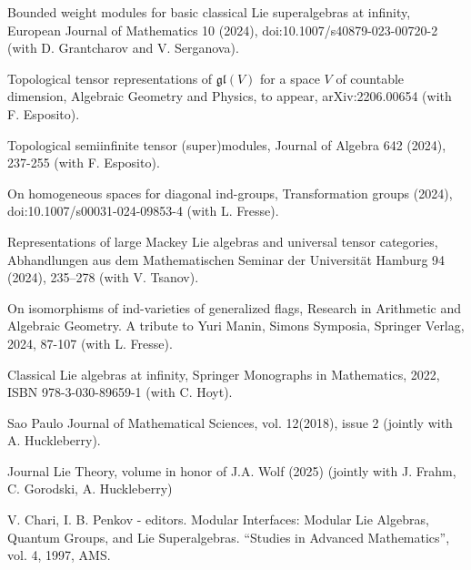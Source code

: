 \documentclass[11pt]{amsart}
\begin{document}
\myss \label{88.} Bounded weight modules for basic classical Lie superalgebras at infinity, European Journal of Mathematics 10 (2024), doi:10.1007/s40879-023-00720-2 (with D. Grantcharov and V. Serganova).

\myss \label{89.} Topological tensor representations of \(\mathfrak{gl}(V)\) for a space \(V\) of countable dimension, Algebraic Geometry and Physics, to appear, arXiv:2206.00654 (with F. Esposito).

\myss \label{90.} Topological semiinfinite tensor (super)modules, Journal of Algebra 642 (2024), 237-255 (with F. Esposito).

\myss \label{91.} On homogeneous spaces for diagonal ind-groups, Transformation groups (2024), doi:10.1007/s00031-024-09853-4 (with L. Fresse).

\myss \label{92.} Representations of large Mackey Lie algebras and universal tensor categories, Abhandlungen aus dem Mathematischen Seminar der Universität Hamburg 94 (2024), 235–278 (with V. Tsanov).

\myss \label{93.} On isomorphisms of ind-varieties of generalized flags, Research in Arithmetic and Algebraic Geometry. A tribute to Yuri Manin, Simons Symposia, Springer Verlag, 2024, 87-107 (with L. Fresse).

\vspace*{1cm}

\pagebreak


\myss \label{1.} Classical Lie algebras at infinity, Springer Monographs in Mathematics, 2022, ISBN 978-3-030-89659-1 (with C. Hoyt).

\vspace*{1cm}


\myss \label{1.} Sao Paulo Journal of Mathematical Sciences, vol. 12(2018), issue 2 (jointly with A. Huckleberry).

\myss \label{2.} Journal Lie Theory, volume in honor of J.A. Wolf (2025) (jointly with J. Frahm, C. Gorodski, A. Huckleberry)

\vspace*{1cm}


\medskip

\myss \label{1.} V. Chari, I. B. Penkov - editors. Modular Interfaces: Modular Lie Algebras,
Quantum Groups, and Lie Superalgebras. ``Studies in Advanced Mathematics'', vol. 4, 1997, AMS. 
\end{document}

